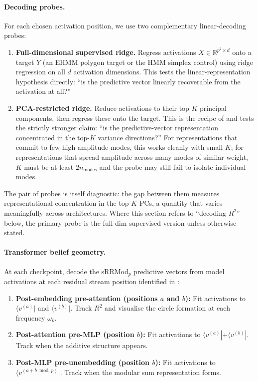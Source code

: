 \documentclass[11pt,a4paper]{article}
\begin{document}
\paragraph{Decoding probes.} For each chosen activation position, we use two complementary linear-decoding probes:
\begin{enumerate}[label=(\roman*)]
    \item \textbf{Full-dimensional supervised ridge.} Regress activations $X \in \mathbb{R}^{p^2 \times d}$ onto a target $Y$ (an EHMM polygon target or the HMM simplex control) using ridge regression on all $d$ activation dimensions. This tests the linear-representation hypothesis directly: ``is the predictive vector linearly recoverable from the activation at all?''
    \item \textbf{PCA-restricted ridge.} Reduce activations to their top $K$ principal components, then regress these onto the target. This is the recipe of \citet{poncini2025compmech} and tests the strictly stronger claim: ``is the predictive-vector representation concentrated in the top-$K$ variance directions?'' For representations that commit to few high-amplitude modes, this works cleanly with small $K$; for representations that spread amplitude across many modes of similar weight, $K$ must be at least $2 n_{\mathrm{modes}}$ and the probe may still fail to isolate individual modes.
\end{enumerate}
The pair of probes is itself diagnostic: the gap between them measures representational concentration in the top-$K$ PCs, a quantity that varies meaningfully across architectures. Where this section refers to ``decoding $R^2$'' below, the primary probe is the full-dim supervised version unless otherwise stated.

\paragraph{Transformer belief geometry.} At each checkpoint, decode the sRRMod$_p$ predictive vectors from model activations at each residual stream position identified in \citet{poncini2025compmech}:
\begin{enumerate}[label=(\alph*)]
    \item \textbf{Post-embedding pre-attention (positions $a$ and $b$):} Fit activations to $\langle v^{(a)}|$ and $\langle v^{(b)}|$. Track $R^2$ and visualise the circle formation at each frequency $\omega_k$.
    \item \textbf{Post-attention pre-MLP (position $b$):} Fit activations to $\langle v^{(a)}| + \langle v^{(b)}|$. Track when the additive structure appears.
    \item \textbf{Post-MLP pre-unembedding (position $b$):} Fit activations to $\langle v^{(a+b \bmod p)}|$. Track when the modular sum representation forms.
\end{enumerate}
\end{document}
